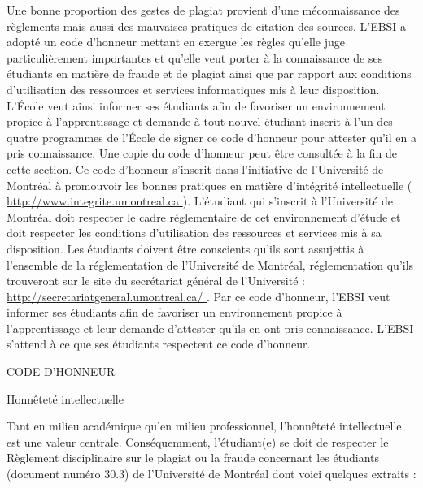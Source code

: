 \documentclass [12 pt]{article}
\begin{document}
            Une bonne proportion des gestes de plagiat provient d'une méconnaissance des
                règlements mais aussi des mauvaises pratiques de citation des sources.
            L'EBSI a adopté un code d'honneur mettant en exergue les règles qu'elle juge
                particulièrement importantes et qu'elle veut porter à la connaissance de ses
                étudiants en matière de fraude et de plagiat ainsi que par rapport aux conditions
                d'utilisation des ressources et services informatiques mis à leur disposition.
                L'École veut ainsi informer ses étudiants afin de favoriser un environnement propice
                à l'apprentissage et demande à tout nouvel étudiant inscrit à l'un des quatre
                programmes de l'École de signer ce code d'honneur pour attester qu'il en a pris
                connaissance. Une copie du code d'honneur peut être consultée à la fin de cette
                section.
            Ce code d'honneur s'inscrit dans l'initiative de l'Université de Montréal à
                promouvoir les bonnes pratiques en matière d'intégrité intellectuelle (
        \href{
        http://www.integrite.umontreal.ca
        } {
        http://www.integrite.umontreal.ca
        }
    ).
            L'étudiant qui s'inscrit à l'Université de Montréal doit respecter le cadre
                réglementaire de cet environnement d'étude et doit respecter les conditions
                d'utilisation des ressources et services mis à sa disposition.
            Les étudiants doivent être conscients qu'ils sont assujettis à l'ensemble de la
                réglementation de l'Université de Montréal, réglementation qu'ils trouveront sur le
                site du secrétariat général de l'Université : 
        \href{
        http://secretariatgeneral.umontreal.ca/
        } {
        http://secretariatgeneral.umontreal.ca/
        }
    .
            Par ce code d'honneur, l'EBSI veut informer ses étudiants afin de favoriser un
                environnement propice à l'apprentissage et leur demande d'attester qu'ils en ont
                pris connaissance. L'EBSI s'attend à ce que ses étudiants respectent ce code
                d'honneur.
             
            
                CODE D'HONNEUR
            
            
                
                    Honnêteté intellectuelle
                
            
            Tant en milieu académique qu'en milieu professionnel, l'honnêteté intellectuelle est
                une valeur centrale. Conséquemment, l'étudiant(e) se doit de respecter le Règlement
                disciplinaire sur le plagiat ou la fraude concernant les étudiants (document numéro
                30.3) de l'Université de Montréal dont voici quelques extraits :
            
\end{document}
